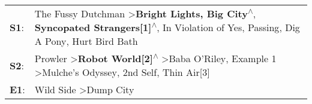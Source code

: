 \begin{supertabular}{p{0.03\textwidth}p{0.92\textwidth}}
 \textbf{S1}:  &  The Fussy Dutchman\textsuperscript{} \textgreater \enspace \textbf{Bright Lights, Big City\textsuperscript{$\wedge$}}, \enspace \textbf{Syncopated Strangers[1]\textsuperscript{$\wedge$}}, \enspace In Violation of Yes\textsuperscript{}, \enspace Passing\textsuperscript{}, \enspace Dig A Pony\textsuperscript{}, \enspace Hurt Bird Bath\textsuperscript{}  \enspace  \\
 \textbf{S2}:  &                                Prowler\textsuperscript{} \textgreater \enspace \textbf{Robot World[2]\textsuperscript{$\wedge$}} \textgreater \enspace Baba O'Riley\textsuperscript{}, \enspace Example 1\textsuperscript{} \textgreater \enspace Mulche's Odyssey\textsuperscript{}, \enspace 2nd Self\textsuperscript{}, \enspace Thin Air[3]\textsuperscript{}  \enspace  \\
 \textbf{E1}:  &                                                                                                                                                                                                                                                                                     Wild Side\textsuperscript{} \textgreater \enspace Dump City\textsuperscript{}  \enspace  \\
\end{supertabular}

